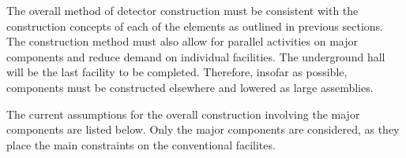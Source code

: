 
The overall method of detector construction must be consistent with the construction concepts of each of the elements as outlined in previous sections. The construction method must also allow for parallel activities on major components and reduce demand on individual facilities. The underground hall will be the last facility to be completed. Therefore, insofar as possible, components must be constructed elsewhere and lowered as large assemblies.

The current assumptions for the overall construction involving the major components are listed below.  Only the major components are considered, as they place the main constraints on the conventional facilites.
